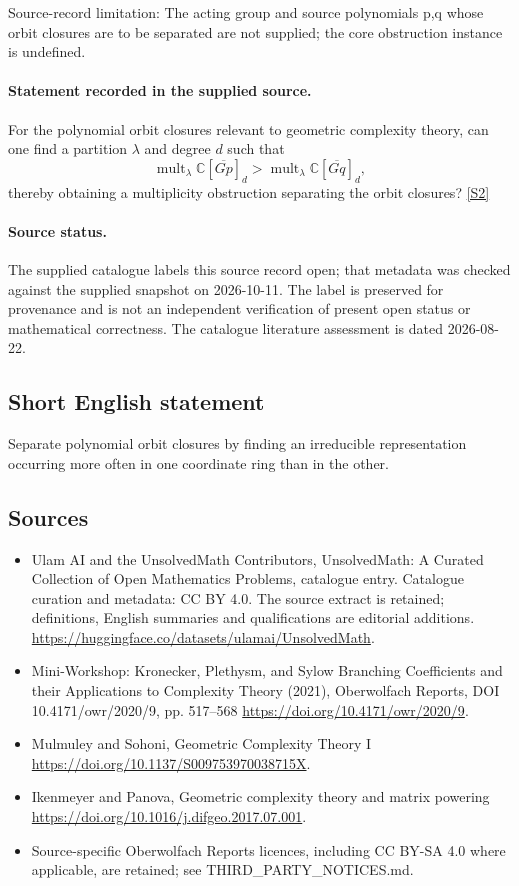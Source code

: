 \documentclass[11pt]{article}
\begin{document}
Source-record limitation: The acting group and source polynomials p,q whose orbit closures are to be separated are not supplied; the core obstruction instance is undefined.
\paragraph{Statement recorded in the supplied source.}
For the polynomial orbit closures relevant to geometric complexity theory, can one find a partition $\lambda$ and degree $d$ such that
$$
\operatorname{mult}_\lambda\mathbb C[\overline{Gp}]_d>\operatorname{mult}_\lambda\mathbb C[\overline{Gq}]_d,
$$
thereby obtaining a multiplicity obstruction separating the orbit closures? \href{https://doi.org/10.4171/owr/2020/9}{[S2]}
\paragraph{Source status.}
The supplied catalogue labels this source record open; that metadata was checked against the supplied snapshot on 2026-10-11. The label is preserved for provenance and is not an independent verification of present open status or mathematical correctness. The catalogue literature assessment is dated 2026-08-22.
\subsection{Short English statement}
Separate polynomial orbit closures by finding an irreducible representation occurring more often in one coordinate ring than in the other.
\subsection{Sources}
\begin{itemize}
\item[S1] Ulam AI and the UnsolvedMath Contributors, UnsolvedMath: A Curated Collection of Open Mathematics Problems, catalogue entry. Catalogue curation and metadata: CC BY 4.0. The source extract is retained; definitions, English summaries and qualifications are editorial additions.
\url{https://huggingface.co/datasets/ulamai/UnsolvedMath}.
\item[S2] Mini-Workshop: Kronecker, Plethysm, and Sylow Branching Coefficients and their Applications to Complexity Theory (2021), Oberwolfach Reports, DOI 10.4171/owr/2020/9, pp. 517--568
\url{https://doi.org/10.4171/owr/2020/9}.
\item[S3] Mulmuley and Sohoni, Geometric Complexity Theory I
\url{https://doi.org/10.1137/S009753970038715X}.
\item[S4] Ikenmeyer and Panova, Geometric complexity theory and matrix powering
\url{https://doi.org/10.1016/j.difgeo.2017.07.001}.
\item Source-specific Oberwolfach Reports licences, including CC BY-SA 4.0 where applicable, are retained; see THIRD\_PARTY\_NOTICES.md.
\end{itemize}
\end{document}
